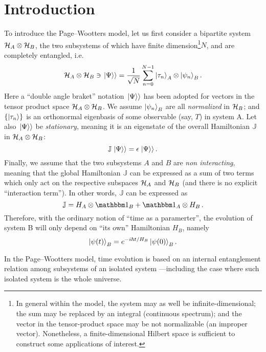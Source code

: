 \section{Introduction}

To introduce the Page--Wootters model, let us first consider
a bipartite system $\mathcal{H}_A \otimes \mathcal{H}_B$,
the two subsystems of which have finite dimension\footnote{
  In general within the model,
  the system may as well be infinite-dimensional;
  the sum may be replaced by an integral (continuous spectrum);
  and the vector in the tensor-product space may be not normalizable (an improper vector).
  Nonetheless, a finite-dimensional Hilbert space is sufficient to construct some applications of interest.
}$N$,
and are completely
entangled, i.e.
\begin{equation}\label{eq:pw:finite-entanglement}
  \mathcal{H}_A \otimes \mathcal{H}_B \ni \left.\left| \Psi \right\rangle\right\rangle
  =
  \frac{1}{\sqrt{N}} \sum_{n=0}^{N-1} \ket{\tau_{n}}_{A} \otimes \ket{\psi_{n}}_{B} \text{.}
\end{equation}
Here
a ``double angle braket'' notation $\left.\left| \Psi \right\rangle\right\rangle$ has been adopted
for vectors in the tensor product space $\mathcal{H}_A \otimes \mathcal{H}_B$.
We assume $\ket{\psi_{n}}_{B}$ are all \emph{normalized} in $\mathcal{H}_B$;
and
$\qty{\ket{{\tau}_n}}$ is an orthonormal eigenbasis of some observable (say, $T$) in system A.
Let also $\left.\left| \Psi \right\rangle\right\rangle$ be \emph{stationary}, meaning it is an eigenstate
of the overall Hamiltonian $\mathbb{J}$ in $\mathcal{H}_A \otimes \mathcal{H}_B$:
$$
  \mathbb{J} \left.\left| \Psi \right\rangle\right\rangle = \epsilon \left.\left| \Psi \right\rangle\right\rangle \text{.}
$$
Finally, we assume that the two subsystems $A$ and $B$ are \emph{non interacting},
meaning that the global Hamiltonian $\mathbb{J}$ can be expressed as a sum of two terms
which only act on the respective subspaces $\mathcal{H}_A$ and $\mathcal{H}_B$
(and there is no explicit ``interaction term''). In other words,
$\mathbb{J}$ can be expressed as
$$
  \mathbb{J} = H_A \ox \idop_B + \idop_A \ox H_B \, \text{.} 
$$
Therefore, with the ordinary notion of ``time as a paramerter'',
the evolution of system B will only depend on ``its own'' Hamiltonian $H_B$, namely
\begin{equation}\label{eq:pw:ordinary_B}
  \ket{\psi(t)}_B = e^{- i \hbar t / H_B } \ket{\psi(0)}_B \text{.}  
\end{equation}
 
In the Page--Wootters model, time evolution is based on an internal entanglement
relation among subsystems of an isolated system
---including the case where such isolated system is the whole universe.

